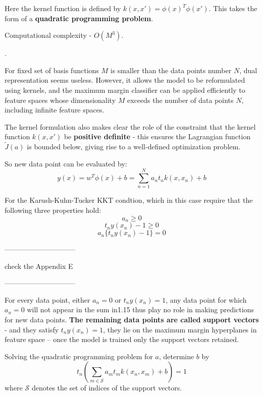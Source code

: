 \documentclass[twoside]{article}
\begin{document}
Here the kernel function is defined by $k(x, x')=\phi(x)^T\phi(x')$. This takes the form of a \textbf{quadratic programming problem}.

Computational complexity - $O(M^3)$.

{\color{red}{With dual formulation, the original optimization problem involved minimizing over $M$ variables into the dual problem with $N$ variables}}.

For fixed set of basis functions $M$ is smaller than the data points number $N$, dual representation seems useless.
However, it allows the model to be reformulated using kernels, and the maximum margin classifier can be applied efficiently to feature spaces whose dimensionality $M$ exceeds the number of data points $N$, including infinite feature spaces.

The kernel formulation also makes clear the role of the constraint that the kernel function $k(x, x')$ be \textbf{positive definite} - this ensures the Lagrangian function $\tilde{J}(a)$ is bounded below, giving rise to a well-defined optimization problem.

So new data point can be evaluated by:
\begin{equation}
y(x) = w^T\phi(x)+b = \sum_{n=1}^{N} a_n t_n k(x, x_n)+b
\end{equation}

For the Karush-Kuhn-Tucker KKT condtion, which in this case require that the following three properties hold:
\begin{equation}
a_n\geq0
\end{equation}
\begin{equation}
t_ny(x_n) - 1 \geq 0
\end{equation}
\begin{equation}
a_n\{t_n y(x_n)-1\} = 0
\end{equation}

------------------------------

check the Appendix E

------------------------------

For every data point, either $a_n=0$ or $t_ny(x_n)=1$, any data point for which $a_n=0$ will not appear in the sum in1.15 thus play no role in making predictions for new data points. \textbf{The remaining data points are called support vectors} - and they satisfy $t_ny(x_n)=1$, they lie on the maximum margin hyperplanes in feature space -- once the model is trained only the support vectors retained.

Solving the quadratic programming problem for $a$, determine $b$ by 
\begin{equation}
t_n(\sum_{m\in \mathcal{S}} a_mt_mk(x_n, x_m)+b)=1
\end{equation} where $\mathcal{S}$ denotes the set of indices of the support vectors.
\end{document}
